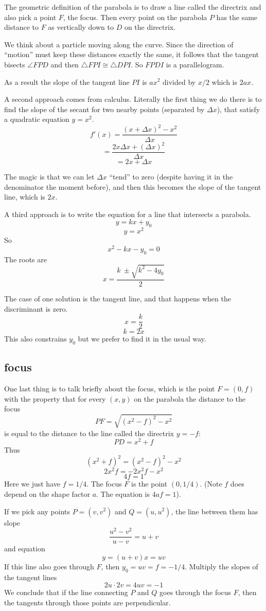 \documentclass[11pt, oneside]{article}
\begin{document}
The geometric definition of the parabola is to draw a line called the directrix and also pick a point $F$, the focus.  Then every point on the parabola $P$ has the same distance to $F$ as vertically down to $D$ on the directrix.  

We think about a particle moving along the curve.  Since the direction of ``motion'' must keep these distances exactly the same, it follows that the tangent bisects $\angle FPD$ and then $\triangle FPI \cong \triangle DPI$.  So $FPDI$ is a parallelogram.

As a result the slope of the tangent line $PI$ is $ax^2$ divided by $x/2$ which is $2ax$.

A second approach comes from calculus.  Literally the first thing we do there is to find the slope of the secant for two nearby points (separated by $\Delta x$), that satisfy a quadratic equation $y = x^2$.
\[ f'(x) = \frac{(x+\Delta x)^2 - x^2}{\Delta x} \]
\[ = \frac{2x \Delta x + (\Delta x)^2}{\Delta x} \]
\[ = 2x + \Delta x \]

The magic is that we can let $\Delta x$ ``tend'' to zero (despite having it in the denominator the moment before), and then this becomes the slope of the tangent line, which is $2x$.

A third approach is to write the equation for a line that intersects a parabola.
\[  y = kx + y_0 \]
\[ y = x^2  \]
So
\[ x^2 - kx - y_0 = 0 \]
The roots are
\[ x = \frac{k \ \pm \sqrt{k^2 - 4y_0}}{2} \]

The case of one solution is the tangent line, and that happens when the discriminant is zero.
\[ x = \frac{k}{2} \]
\[ k = 2x \]
This also constrains $y_0$ but we prefer to find it in the usual way.

\subsection*{focus}
One last thing is to talk briefly about the focus, which is the point $F = (0,f)$ with the property that for every $(x,y)$ on the parabola the distance to the focus
\[ PF = \sqrt{(x^2-f)^2 - x^2} \]
is equal to the distance to the line called the directrix $y = -f$:
\[ PD = x^2 + f \]
Thus
\[ (x^2 + f)^2 = (x^2-f)^2 - x^2 \]
\[ 2x^2f = -2x^2f - x^2 \]
\[ 4f = 1 \]
Here we just have $f = 1/4$.  The focus $F$ is the point $(0,1/4)$.  (Note $f$ does depend on the shape factor $a$.  The equation is $4af = 1$).

If we pick any points $P = (v,v^2)$ and $Q=(u,u^2)$, the line between them has slope 
\[ \frac{u^2 - v^2}{u - v} = u + v \]
and equation
\[ y = (u + v)x = uv \]
If this line also goes through $F$, then $y_0 = uv = f = -1/4$.  Multiply the slopes of the tangent lines
\[ 2u \cdot 2v = 4uv = -1 \]
We conclude that if the line connecting $P$ and $Q$ goes through the focus $F$, then the tangents through those points are perpendicular.
\end{document}
